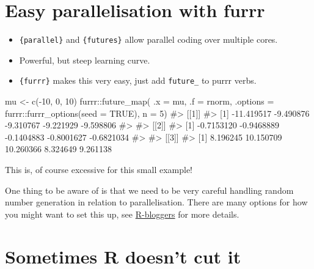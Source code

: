 \documentclass[
  letterpaper,
  DIV=11,
  numbers=noendperiod]{scrreprt}
\newenvironment{Shaded}{\begin{snugshade}}{\end{snugshade}}
\newcommand{\AttributeTok}[1]{\textcolor[rgb]{0.40,0.45,0.13}{#1}}
\newcommand{\CommentTok}[1]{\textcolor[rgb]{0.37,0.37,0.37}{#1}}
\newcommand{\ConstantTok}[1]{\textcolor[rgb]{0.56,0.35,0.01}{#1}}
\newcommand{\DecValTok}[1]{\textcolor[rgb]{0.68,0.00,0.00}{#1}}
\newcommand{\FunctionTok}[1]{\textcolor[rgb]{0.28,0.35,0.67}{#1}}
\newcommand{\NormalTok}[1]{\textcolor[rgb]{0.00,0.23,0.31}{#1}}
\newcommand{\OtherTok}[1]{\textcolor[rgb]{0.00,0.23,0.31}{#1}}
\newcommand{\SpecialCharTok}[1]{\textcolor[rgb]{0.37,0.37,0.37}{#1}}
\begin{document}
\section{Easy parallelisation with
furrr}\label{easy-parallelisation-with-furrr}

\begin{itemize}
\item
  \texttt{\{parallel\}} and \texttt{\{futures\}} allow parallel coding
  over multiple cores.
\item
  Powerful, but steep learning curve.
\item
  \texttt{\{furrr\}} makes this very easy, just add \texttt{future\_} to
  purrr verbs.
\end{itemize}

\begin{Shaded}
\begin{Highlighting}[]
\NormalTok{mu }\OtherTok{\textless{}{-}} \FunctionTok{c}\NormalTok{(}\SpecialCharTok{{-}}\DecValTok{10}\NormalTok{, }\DecValTok{0}\NormalTok{, }\DecValTok{10}\NormalTok{)}
\NormalTok{furrr}\SpecialCharTok{::}\FunctionTok{future\_map}\NormalTok{(}
  \AttributeTok{.x =}\NormalTok{ mu, }
  \AttributeTok{.f =}\NormalTok{ rnorm,}
  \AttributeTok{.options =}\NormalTok{ furrr}\SpecialCharTok{::}\FunctionTok{furrr\_options}\NormalTok{(}\AttributeTok{seed =} \ConstantTok{TRUE}\NormalTok{),}
  \AttributeTok{n =} \DecValTok{5}\NormalTok{) }
\CommentTok{\#\textgreater{} [[1]]}
\CommentTok{\#\textgreater{} [1] {-}11.419517  {-}9.490876  {-}9.310767  {-}9.221929  {-}9.598806}
\CommentTok{\#\textgreater{} }
\CommentTok{\#\textgreater{} [[2]]}
\CommentTok{\#\textgreater{} [1] {-}0.7153120 {-}0.9468889 {-}0.1404883 {-}0.8001627 {-}0.6821034}
\CommentTok{\#\textgreater{} }
\CommentTok{\#\textgreater{} [[3]]}
\CommentTok{\#\textgreater{} [1]  8.196245 10.150709 10.260366  8.324649  9.261138}
\end{Highlighting}
\end{Shaded}

This is, of course excessive for this small example!

One thing to be aware of is that we need to be very careful handling
random number generation in relation to parallelisation. There are many
options for how you might want to set this up, see
\href{https://www.r-bloggers.com/2020/09/future-1-19-1-making-sure-proper-random-numbers-are-produced-in-parallel-processing/}{R-bloggers}
for more details.

\section{Sometimes R doesn't cut it}\label{sometimes-r-doesnt-cut-it}
\end{document}
